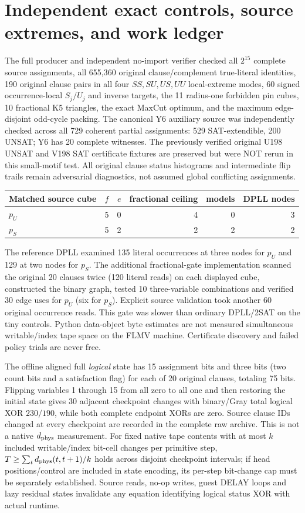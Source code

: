 \documentclass[11pt]{article}
\begin{document}
\section{Independent exact controls, source extremes, and work ledger}
The full producer and independent no-import verifier checked all $2^{15}$ complete source assignments, all 655,360 original clause/complement true-literal identities, 190 original clause pairs in all four $SS,SU,US,UU$ local-extreme modes, 60 signed occurrence-local $S_j/U_j$ and inverse targets, the 11 radius-one forbidden pin cubes, 10 fractional K5 triangles, the exact MaxCut optimum, and the maximum edge-disjoint odd-cycle packing. The canonical Y6 auxiliary source was independently checked across all 729 coherent partial assignments: 529 SAT-extendible, 200 UNSAT; Y6 has 20 complete witnesses. The previously verified original U198 UNSAT and V198 SAT certificate fixtures are preserved but were NOT rerun in this small-motif test. All original clause status histograms and intermediate flip trails remain adversarial diagnostics, not assumed global conflicting assignments.

\begin{center}\begin{tabular}{lrrrrr}\toprule
Matched source cube&$f$&$e$&fractional ceiling&models&DPLL nodes\\\midrule
$p_U$&5&0&4&0&3\\
$p_S$&5&2&2&2&2\\\bottomrule\end{tabular}\end{center}
The reference DPLL examined 135 literal occurrences at three nodes for $p_U$ and 129 at two nodes for $p_S$. The additional fractional-gate implementation scanned the original 20 clauses twice (120 literal reads) on each displayed cube, constructed the binary graph, tested 10 three-variable combinations and verified 30 edge uses for $p_U$ (six for $p_S$). Explicit source validation took another 60 original occurrence reads. This gate was slower than ordinary DPLL/2SAT on the tiny controls. Python data-object byte estimates are not measured simultaneous writable/index tape space on the FLMV machine. Certificate discovery and failed policy trials are never free.

The offline aligned full \emph{logical} state has 15 assignment bits and three bits (two count bits and a satisfaction flag) for each of 20 original clauses, totaling 75 bits. Flipping variables 1 through 15 from all zero to all one and then restoring the initial state gives 30 adjacent checkpoint changes with binary/Gray total logical XOR $230/190$, while both complete endpoint XORs are zero. Source clause IDs changed at every checkpoint are recorded in the complete raw archive. This is not a native $d_{\rm phys}$ measurement. For fixed native tape contents with at most $k$ included writable/index bit-cell changes per primitive step, $T\ge\sum_t d_{\rm phys}(t,t+1)/k$ holds across disjoint checkpoint intervals; if head positions/control are included in state encoding, its per-step bit-change cap must be separately established. Source reads, no-op writes, guest DELAY loops and lazy residual states invalidate any equation identifying logical status XOR with actual runtime.
\end{document}
